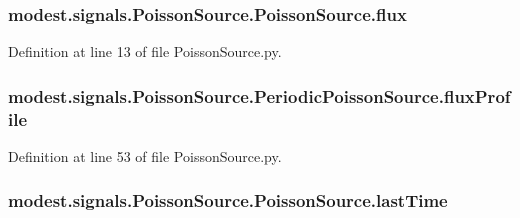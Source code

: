 \subsubsection[{\texorpdfstring{flux}{flux}}]{\setlength{\rightskip}{0pt plus 5cm}modest.\+signals.\+Poisson\+Source.\+Poisson\+Source.\+flux\hspace{0.3cm}{\ttfamily [inherited]}}\hypertarget{classmodest_1_1signals_1_1PoissonSource_1_1PoissonSource_ae0a95ae74b0d1df57ed10a7eeb8fa754}{}\label{classmodest_1_1signals_1_1PoissonSource_1_1PoissonSource_ae0a95ae74b0d1df57ed10a7eeb8fa754}


Definition at line 13 of file Poisson\+Source.\+py.

\subsubsection[{\texorpdfstring{flux\+Profile}{fluxProfile}}]{\setlength{\rightskip}{0pt plus 5cm}modest.\+signals.\+Poisson\+Source.\+Periodic\+Poisson\+Source.\+flux\+Profile}\hypertarget{classmodest_1_1signals_1_1PoissonSource_1_1PeriodicPoissonSource_a1b49b8fb6d2efd08be11980c0b387d64}{}\label{classmodest_1_1signals_1_1PoissonSource_1_1PeriodicPoissonSource_a1b49b8fb6d2efd08be11980c0b387d64}


Definition at line 53 of file Poisson\+Source.\+py.

\subsubsection[{\texorpdfstring{last\+Time}{lastTime}}]{\setlength{\rightskip}{0pt plus 5cm}modest.\+signals.\+Poisson\+Source.\+Poisson\+Source.\+last\+Time\hspace{0.3cm}{\ttfamily [inherited]}}\hypertarget{classmodest_1_1signals_1_1PoissonSource_1_1PoissonSource_a982ffe5add48d52a24d16483c7a26a5b}{}\label{classmodest_1_1signals_1_1PoissonSource_1_1PoissonSource_a982ffe5add48d52a24d16483c7a26a5b}


